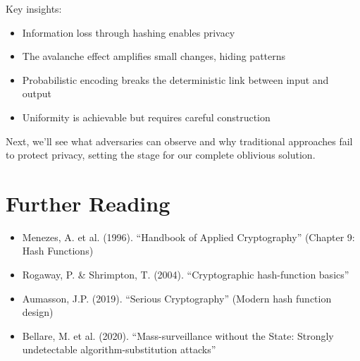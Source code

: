 Key insights:
\begin{itemize}
\item Information loss through hashing enables privacy
\item The avalanche effect amplifies small changes, hiding patterns
\item Probabilistic encoding breaks the deterministic link between input and output
\item Uniformity is achievable but requires careful construction
\end{itemize}

Next, we'll see what adversaries can observe and why traditional approaches fail to protect privacy, setting the stage for our complete oblivious solution.

\section{Further Reading}

\begin{itemize}
\item Menezes, A. et al. (1996). ``Handbook of Applied Cryptography'' (Chapter 9: Hash Functions)
\item Rogaway, P. \& Shrimpton, T. (2004). ``Cryptographic hash-function basics''
\item Aumasson, J.P. (2019). ``Serious Cryptography'' (Modern hash function design)
\item Bellare, M. et al. (2020). ``Mass-surveillance without the State: Strongly undetectable algorithm-substitution attacks''
\end{itemize}